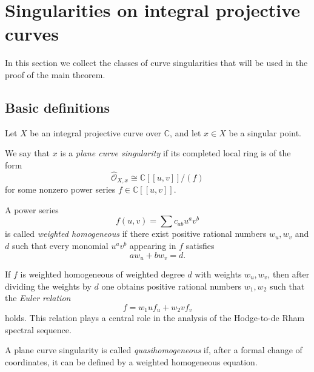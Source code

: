 \documentclass[12pt,reqno]{amsart}
\begin{document}


\section{Singularities on integral projective curves}\label{sec:singularities}

In this section we collect the classes of curve singularities that will be used in the proof of the main theorem.

\subsection{Basic definitions}

Let $X$ be an integral projective curve over $\mathbb{C}$, and let $x\in X$ be a singular point. 

\begin{definition}
We say that $x$ is a \emph{plane curve singularity} if its completed local ring is of the form
\[
\widehat{\mathcal O}_{X,x}\cong \mathbb{C}[[u,v]]/(f)
\]
for some nonzero power series $f\in \mathbb{C}[[u,v]]$.
\end{definition}

\begin{definition}
A power series
\[
f(u,v)=\sum c_{ab}u^a v^b
\]
is called \emph{weighted homogeneous} if there exist positive rational numbers $w_u,w_v$ and \(d\) such that every monomial $u^av^b$ appearing in $f$ satisfies
\[
aw_u+bw_v=d.
\]
\end{definition}

\begin{remark}
If \(f\) is weighted homogeneous of weighted degree \(d\) with weights \(w_u,w_v\), then after dividing the weights by \(d\) one obtains positive rational numbers \(w_1,w_2\) such that the \emph{Euler relation}
\begin{equation}\label{eq:weighted-euler}
f=w_1u f_u+w_2v f_v
\end{equation}
holds. This relation plays a central role in the analysis of the Hodge-to-de Rham spectral sequence.
\end{remark}

\begin{definition}
A plane curve singularity is called \emph{quasihomogeneous} if, after a formal change of coordinates, it can be defined by a weighted homogeneous equation.
\end{definition}
\end{document}
